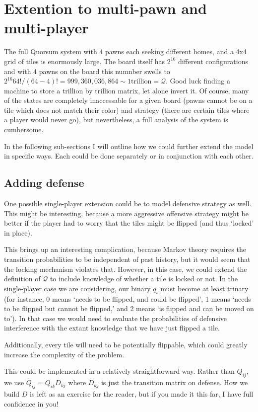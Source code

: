 \documentclass[letterpaper]{article}
\begin{document}
\section{Extention to multi-pawn and multi-player}
The full Quorsum system with 4 pawns each seeking different homes, and a 4x4
grid of tiles is enormously large.  The board itself has $2^{16}$ different
configurations and with 4 pawns on the board this numnber swells to 
$2^{16} 64!/(64-4)! = 999,360,036,864 \sim \mathrm{1 trillion}=\mathcal{Q}$.
Good luck finding a machine to store a trillion by trillion matrix, let alone
invert it.  Of course, many of the states are completely inaccessable for a
given board (pawns cannot be on a tile which does not match their color)
and strategy (there are certain tiles where a player would never go), but
nevertheless, a full analysis of the system is cumbersome.

In the following sub-sections I will outline how we could further extend the
model in specific ways.  Each could be done separately or in conjunction with
each other. 

\subsection{Adding defense}
One possible single-player extension could be to model defensive strategy as
well.  This might be interesting, because a more aggressive offensive strategy
might be better if the player had to worry that the tiles might be flipped (and
thus `locked' in place).

This brings up an interesting complication, because Markov theory requires the
transition probabilities to be independent of past history, but it would seem
that the locking mechanism violates that.  However, in this case, we could
extend the definition of $\mathcal{Q}$ to include knowledge of whether a tile
is locked or not.  In the single-player case we are considering, our binary 
$q_i$ must become at least trinary (for instance, 0 means `needs to be flipped,
and could be flipped', 1 means `needs to be flipped but cannot be flipped,'
and 2 means `is flipped and can be moved on to').  In that case we would need
to evaluate the probabilities of defensive interference with the extant
knowledge that we have just flipped a tile.

Additionally, every tile will need to be potentially flippable, which could
greatly increase the complexity of the problem.

This could be implemented in a relatively straightforward way.  Rather than
$Q_{ij}$, we use $\tilde{Q}_{ij} = Q_{ik}D_{kj}$ where $D_{kj}$ is just the
transition matrix on defense.  How we build $D$ is left as an exercise for the
reader, but if you made it this far, I have full confidence in you!
\end{document}

